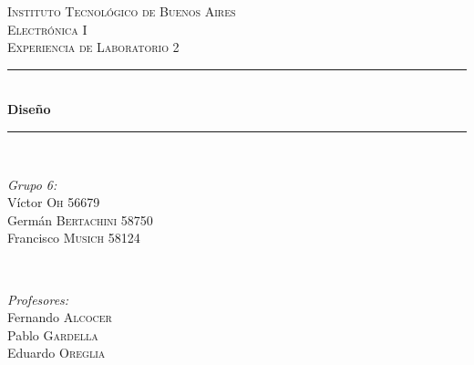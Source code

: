 \begin{titlepage}
    \newcommand{\HRule}{\rule{\linewidth}{0.5mm}}
    \center
    \textsc{\LARGE Instituto Tecnológico de Buenos Aires}\\[1.2cm]
    \textsc{\Large Electrónica I}\\[0.5cm]
    \textsc{\large Experiencia de Laboratorio 2}\\[0.5cm]
    
    \HRule \\[0.4cm]
    { \huge \bfseries  Diseño}\\[0.4cm] %
    \HRule \\[1.5cm]
    
    
    \begin{minipage}{0.4\textwidth}
    \begin{flushleft} \large
    \emph{Grupo 6:}\\
    Víctor \textsc{Oh} 56679\\
    Germán \textsc{Bertachini}  58750\\
    Francisco \textsc{Musich} 58124\\
    \end{flushleft}
    \end{minipage}
    ~
    \begin{minipage}{0.4\textwidth}
    \begin{flushright} \large
    \emph{Profesores:} \\
    Fernando \textsc{Alcocer}\\
    Pablo \textsc{Gardella}\\
    Eduardo \textsc{Oreglia}
    \end{flushright}
    \end{minipage}\\[4cm]
    
    \vfill %
\end{titlepage}